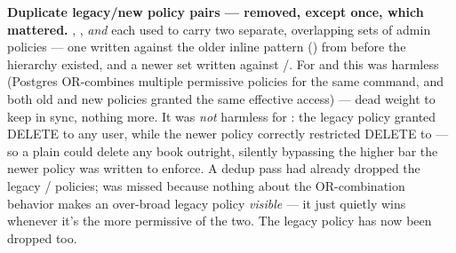 \begin{olknote}
\textbf{Duplicate legacy/new policy pairs — removed, except once, which mattered.} , , \emph{and}  each used to carry two separate, overlapping sets of admin policies — one written against the older inline pattern () from before the  hierarchy existed, and a newer set written against /. For  and  this was harmless (Postgres OR-combines multiple permissive policies for the same command, and both old and new policies granted the same effective access) — dead weight to keep in sync, nothing more. It was \emph{not} harmless for : the legacy  policy granted DELETE to any  user, while the newer  policy correctly restricted DELETE to  — so a plain  could delete any book outright, silently bypassing the higher bar the newer policy was written to enforce. A dedup pass had already dropped the legacy / policies;  was missed because nothing about the OR-combination behavior makes an over-broad legacy policy \emph{visible} — it just quietly wins whenever it's the more permissive of the two. The legacy  policy has now been dropped too.
\end{olknote}

